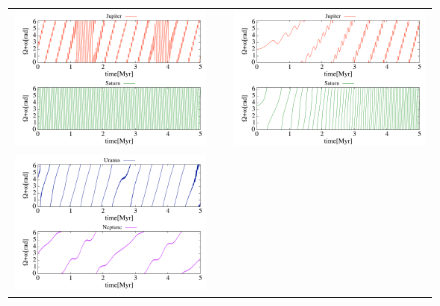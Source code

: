 \documentclass[11pt,a4paper,oneside,onecolumn]{jreport}
\begin{document}
\begin{figure}[H]
\begin{tabular}{ccc}
\begin{minipage}[t]{0.45\hsize}
\centering
\includegraphics[width=8cm]{./image/NoMove_curlypi_5Myr_JUPSAT.pdf}
\end{minipage} &
\begin{minipage}[t]{0.1\hsize}
\end{minipage} &
\begin{minipage}[t]{0.45\hsize}
\centering
\includegraphics[width=8cm]{./image/Move500kyr_curlypi_5Myr_JUPSAT.pdf}
\end{minipage}\\
\begin{minipage}[t]{0.45\hsize}
\centering
\includegraphics[width=8cm]{./image/NoMove_curlypi_5Myr_URANEP.pdf}
\end{minipage} &

\end{tabular}
\end{figure}
\end{document}
